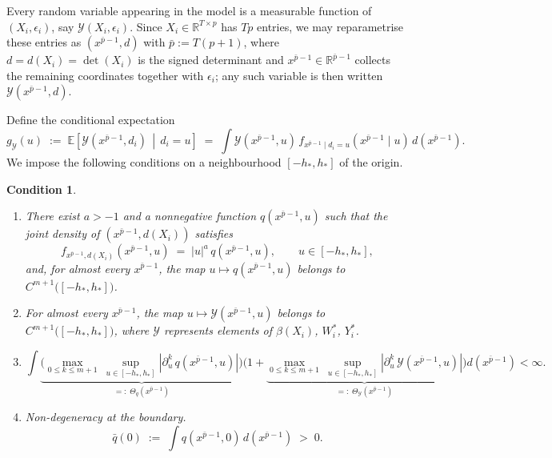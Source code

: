 \documentclass{article}
\newtheorem{condition}{Condition}
\newcommand{\E}{\mathbb{E}}
\newcommand{\R}{\mathbb{R}}
\begin{document}
Every random variable appearing in the model is a measurable function of
$(X_i,\epsilon_i)$, say $\mathcal{Y}(X_i,\epsilon_i)$. Since $X_i\in\R^{T\times p}$
has $Tp$ entries, we may reparametrise these entries as
$\left(x^{\bar p-1},d\right)$ with $\bar p:=T(p+1)$, where $d=d(X_i)=\det(X_i)$ is
the signed determinant and $x^{\bar p-1}\in\R^{\bar p-1}$ collects the remaining
coordinates together with $\epsilon_i$; any such variable is then written
$\mathcal{Y}\!\left(x^{\bar p-1},d\right)$.

Define the conditional expectation
\[
    g_{\mathcal{Y}}(u)\;:=\;\E\!\left[\mathcal{Y}\!\left(x^{\bar{p}-1},d_i\right)
      \,\middle|\,d_i=u\right]
    \;=\;\int \mathcal{Y}\!\left(x^{\bar{p}-1},u\right)\,
      f_{x^{\bar{p}-1}\mid d_i=u}\!\left(x^{\bar{p}-1}\mid u\right)\,
      d\!\left(x^{\bar{p}-1}\right).
\]
We impose the following conditions on a neighbourhood $[-h_{*},h_{*}]$ of the
origin.

\begin{condition}\label{cond:primitive}\leavevmode
\begin{enumerate}
\item\label{prim:factorization}
There exist $a>-1$ and a nonnegative function $q\!\left(x^{\bar{p}-1},u\right)$
such that the joint density of $\left(x^{\bar{p}-1},d(X_i)\right)$ satisfies
\[
    f_{x^{\bar{p}-1},d(X_i)}\!\left(x^{\bar{p}-1},u\right)
    \;=\; |u|^{a}\,q\!\left(x^{\bar{p}-1},u\right),
    \qquad u\in[-h_{*},h_{*}],
\]
and, for almost every $x^{\bar{p}-1}$, the map
$u\mapsto q\!\left(x^{\bar{p}-1},u\right)$ belongs to
$C^{m+1}\bigl([-h_{*},h_{*}]\bigr)$.

\item\label{prim:smoothY}
For almost every $x^{\bar{p}-1}$, the map
$u\mapsto \mathcal{Y}\!\left(x^{\bar{p}-1},u\right)$ belongs to
$C^{m+1}\bigl([-h_{*},h_{*}]\bigr)$, where $\mathcal{Y}$ represents elements of $\beta(X_i)$, $W_i^{*}$, $Y_i^{*}$.

\item\label{prim:envelope}
\[
\int
\underbrace{\Big(\max_{0\le k\le m+1}\ \sup_{u\in[-h_{*},h_{*}]}
\left|\partial_u^{k}\,q\!\left(x^{\bar{p}-1},u\right)\right|\Big)}_{=:\;\Theta_q\left(x^{\bar p-1}\right)}
\Big(1+
\underbrace{\max_{0\le k\le m+1}\ \sup_{u\in[-h_{*},h_{*}]}
\left|\partial_u^{k}\,\mathcal{Y}\!\left(x^{\bar{p}-1},u\right)\right|}_{=:\;\Theta_{\mathcal{Y}}\left(x^{\bar p-1}\right)}\Big)
d\!\left(x^{\bar{p}-1}\right)<\infty .
\]

\item\label{prim:nondegenerate}
\emph{Non-degeneracy at the boundary.}
\[
    \bar q(0)\;:=\;\int q\!\left(x^{\bar{p}-1},0\right)\,d\!\left(x^{\bar{p}-1}\right)\;>\;0 .
\]
\end{enumerate}
\end{condition}
\end{document}
